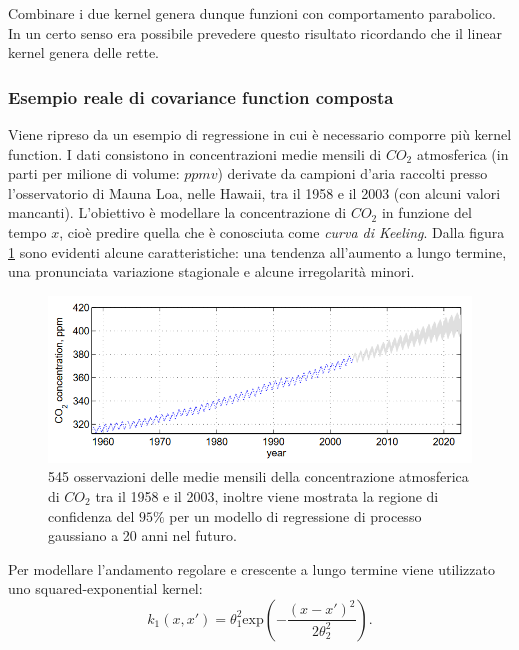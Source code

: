 Combinare i due kernel genera dunque funzioni con comportamento parabolico. In un certo senso era possibile prevedere questo risultato ricordando che il linear kernel genera delle rette.

\newpage



\subsubsection{Esempio reale di covariance function composta}\label{section: mauna loa}
Viene ripreso da \cite{rasmussen_gaussian_2006} un esempio di regressione in cui è necessario comporre più kernel function.  I dati consistono in concentrazioni medie mensili di $CO_2$ atmosferica (in parti per milione di volume: $ppmv$) derivate da campioni d'aria raccolti presso l'osservatorio di Mauna Loa, nelle Hawaii, tra il 1958 e il 2003 (con alcuni valori mancanti). L'obiettivo è modellare la concentrazione di $CO_2$ in funzione del tempo $x$, cioè predire quella che è conosciuta come \textit{curva di Keeling}. Dalla figura \ref{CO2} sono evidenti alcune caratteristiche: una tendenza all'aumento a lungo termine, una pronunciata variazione stagionale e alcune irregolarità minori. 


\begin{figure}[ht]
    \centering
    \includegraphics[width=1\textwidth]{images/Gaussian process/Co2_example.PNG}
    \caption{545 osservazioni delle medie mensili della concentrazione atmosferica di $CO_2$ tra il 1958 e il 2003, inoltre viene mostrata la regione di confidenza del $95\%$ per un modello di regressione di processo gaussiano a 20 anni nel futuro. \cite{rasmussen_gaussian_2006}}
    \label{CO2}
\end{figure}


Per modellare l'andamento regolare e crescente a lungo termine viene utilizzato uno squared-exponential kernel:
\[
k_1(x,x')=\theta_1^2\text{exp}\left(-\frac{(x-x')^2}{2\theta_2^2}\right).
\]


